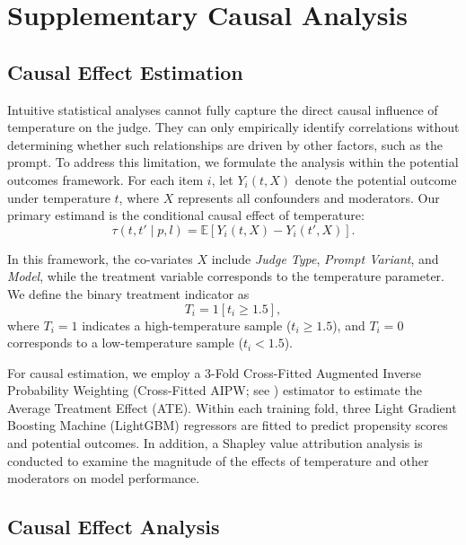 \documentclass[11pt]{article}
\begin{document}





\appendix

\section{Supplementary Causal Analysis}

\subsection{Causal Effect Estimation}

Intuitive statistical analyses cannot fully capture the direct causal influence of temperature on the judge. 
They can only empirically identify correlations without determining whether such relationships are driven by other factors, such as the prompt. 
To address this limitation, we formulate the analysis within the potential outcomes framework. 
For each item \( i \), let \( Y_i(t, X) \) denote the potential outcome under temperature \( t \), 
where \( X \) represents all confounders and moderators. 
Our primary estimand is the conditional causal effect of temperature:
\[
  \tau(t, t' \mid p, l)
  = \mathbb{E}\!\left[Y_i(t, X) - Y_i(t', X)\right].
\]

In this framework, the co-variates \( X \) include \textit{Judge Type}, \textit{Prompt Variant}, and \textit{Model}, 
while the treatment variable corresponds to the temperature parameter. 
We define the binary treatment indicator as
\[
  T_i = 1\!\left[t_i \ge 1.5\right],
\]
where \( T_i = 1 \) indicates a high-temperature sample (\( t_i \ge 1.5 \)), 
and \( T_i = 0 \) corresponds to a low-temperature sample (\( t_i < 1.5 \)).

For causal estimation, we employ a 3-Fold Cross-Fitted Augmented Inverse Probability Weighting 
(Cross-Fitted AIPW; see \cite{chernozhukov2024doubledebiasedmachinelearningtreatment}) estimator 
to estimate the Average Treatment Effect (ATE). 
Within each training fold, three Light Gradient Boosting Machine (LightGBM) regressors are fitted 
to predict propensity scores and potential outcomes. In addition, a Shapley value attribution analysis is conducted to examine the magnitude of the effects of temperature and other moderators on model performance.


\subsection{Causal Effect Analysis}
\end{document}
